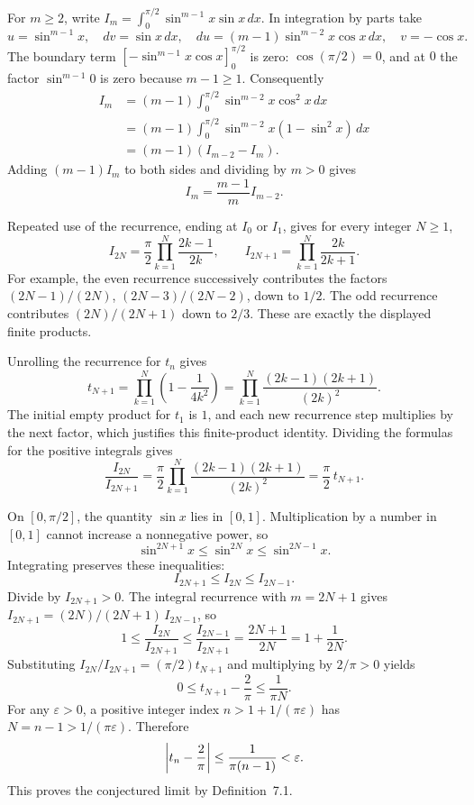 For $m\ge2$, write
$I_m=\int_0^{\pi/2}\sin^{m-1}x\sin x\,dx$.
In integration by parts take
\[
 u=\sin^{m-1}x,\quad dv=\sin x\,dx,\quad
 du=(m-1)\sin^{m-2}x\cos x\,dx,\quad v=-\cos x.
\]
The boundary term
$[-\sin^{m-1}x\cos x]_0^{\pi/2}$ is zero:
$\cos(\pi/2)=0$, and at $0$ the factor $\sin^{m-1}0$ is zero
because $m-1\ge1$. Consequently
\begin{align*}
 I_m
  &=(m-1)\int_0^{\pi/2}\sin^{m-2}x\cos^2x\,dx\\
  &=(m-1)\int_0^{\pi/2}
          \sin^{m-2}x(1-\sin^2x)\,dx\\
  &=(m-1)(I_{m-2}-I_m).
\end{align*}
Adding $(m-1)I_m$ to both sides and dividing by $m>0$ gives
\[
 I_m=\frac{m-1}{m}I_{m-2}.
\]

Repeated use of the recurrence, ending at $I_0$ or $I_1$, gives
for every integer $N\ge1$,
\[
 I_{2N}=\frac\pi2\prod_{k=1}^{N}\frac{2k-1}{2k},
 \qquad
 I_{2N+1}=\prod_{k=1}^{N}\frac{2k}{2k+1}.
\]
For example, the even recurrence successively contributes the factors
$(2N-1)/(2N)$, $(2N-3)/(2N-2)$, down to $1/2$.
The odd recurrence contributes $(2N)/(2N+1)$ down to $2/3$.
These are exactly the displayed finite products.

Unrolling the recurrence for $t_n$ gives
\[
 t_{N+1}
  =\prod_{k=1}^{N}\left(1-\frac1{4k^2}\right)
  =\prod_{k=1}^{N}\frac{(2k-1)(2k+1)}{(2k)^2}.
\]
The initial empty product for $t_1$ is $1$, and each new recurrence
step multiplies by the next factor, which justifies this finite-product
identity. Dividing the formulas for the positive integrals gives
\[
 \frac{I_{2N}}{I_{2N+1}}
   =\frac\pi2
     \prod_{k=1}^{N}\frac{(2k-1)(2k+1)}{(2k)^2}
   =\frac\pi2\,t_{N+1}.
\]

On $[0,\pi/2]$, the quantity $\sin x$ lies in $[0,1]$.
Multiplication by a number in $[0,1]$ cannot increase a nonnegative
power, so
\[
 \sin^{2N+1}x\le\sin^{2N}x\le\sin^{2N-1}x.
\]
Integrating preserves these inequalities:
\[
 I_{2N+1}\le I_{2N}\le I_{2N-1}.
\]
Divide by $I_{2N+1}>0$. The integral recurrence with $m=2N+1$
gives $I_{2N+1}=(2N)/(2N+1)\,I_{2N-1}$, so
\[
 1\le\frac{I_{2N}}{I_{2N+1}}
   \le\frac{I_{2N-1}}{I_{2N+1}}
   =\frac{2N+1}{2N}=1+\frac1{2N}.
\]
Substituting $I_{2N}/I_{2N+1}=(\pi/2)t_{N+1}$ and multiplying
by $2/\pi>0$ yields
\[
 0\le t_{N+1}-\frac2\pi\le\frac1{\pi N}.
\]
For any $\varepsilon>0$, a positive integer index
$n>1+1/(\pi\varepsilon)$ has $N=n-1>1/(\pi\varepsilon)$.
Therefore
\[
 \left|t_n-\frac2\pi\right|\le\frac1{\pi(n-1)}<\varepsilon.
\]
This proves the conjectured limit by Definition~7.1.

